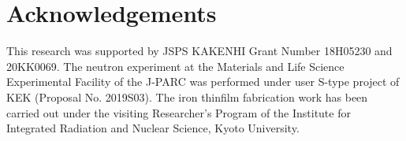 \documentclass{jps-cp}
\begin{document}
\section{Acknowledgements}
\par
This research was supported by JSPS KAKENHI 
Grant Number 18H05230 and 20KK0069.
The neutron experiment at the Materials and Life Science Experimental Facility of the J-PARC was performed under user S-type project of KEK (Proposal No. 2019S03).  The iron thinfilm fabrication work has been carried out under the visiting Researcher’s Program of the Institute for Integrated Radiation and Nuclear Science, Kyoto University.









\end{document}
